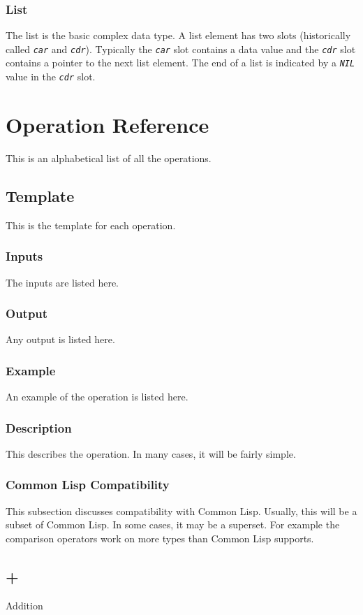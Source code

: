 \documentclass[10pt, openany]{book}
\newcommand{\constant}[1]{\emph{\texttt{#1}}}
\newcommand{\cl}{Common Lisp}
\begin{document}
\subsection{List}
The list is the basic complex data type.  A list element has two slots (historically called \constant{car} and \constant{cdr}).  Typically the \constant{car} slot contains a data value and the \constant{cdr} slot contains a pointer to the next list element.  The end of a list is indicated by a \constant{NIL} value in the \constant{cdr} slot.

\chapter{Operation Reference}
This is an alphabetical list of all the operations.
\section{Template}
This is the template for each operation.
\subsection{Inputs}
The inputs are listed here.
\subsection{Output}
Any output is listed here.
\subsection{Example}
An example of the operation is listed here.
\subsection{Description}
This describes the operation.  In many cases, it will be fairly simple.
\subsection{Common Lisp Compatibility}
This subsection discusses compatibility with \cl.  Usually, this will be a subset of \cl.  In some cases, it may be a superset.  For example the comparison operators work on more types than \cl{} supports.

\section{+}
Addition
\end{document}
